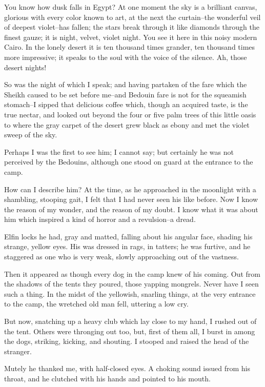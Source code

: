 You know how dusk falls in Egypt? At one moment the sky is a brilliant
canvas, glorious with every color known to art, at the next the
curtain--the wonderful veil of deepest violet--has fallen; the stars
break through it like diamonds through the finest gauze; it is night,
velvet, violet night. You see it here in this noisy modern Cairo. In
the lonely desert it is ten thousand times grander, ten thousand times
more impressive; it speaks to the soul with the voice of the silence.
Ah, those desert nights!

So was the night of which I speak; and having partaken of the fare
which the Sheikh caused to be set before me--and Bedouin fare is not
for the squeamish stomach--I sipped that delicious coffee which,
though an acquired taste, is the true nectar, and looked out beyond
the four or five palm trees of this little oasis to where the gray
carpet of the desert grew black as ebony and met the violet sweep of
the sky.

Perhaps I was the first to see him; I cannot say; but certainly he was
not perceived by the Bedouins, although one stood on guard at the
entrance to the camp.

How can I describe him? At the time, as he approached in the moonlight
with a shambling, stooping gait, I felt that I had never seen his like
before. Now I know the reason of my wonder, and the reason of my
doubt. I know what it was about him which inspired a kind of horror
and a revulsion--a dread.

Elfin locks he had, gray and matted, falling about his angular face,
shading his strange, yellow eyes. His was dressed in rags, in tatters;
he was furtive, and he staggered as one who is very weak, slowly
approaching out of the vastness.

Then it appeared as though every dog in the camp knew of his coming.
Out from the shadows of the tents they poured, those yapping mongrels.
Never have I seen such a thing. In the midst of the yellowish,
snarling things, at the very entrance to the camp, the wretched old
man fell, uttering a low cry.

But now, snatching up a heavy club which lay close to my hand, I
rushed out of the tent. Others were thronging out too, but, first of
them all, I burst in among the dogs, striking, kicking, and shouting.
I stooped and raised the head of the stranger.

Mutely he thanked me, with half-closed eyes. A choking sound issued
from his throat, and he clutched with his hands and pointed to his
mouth.

